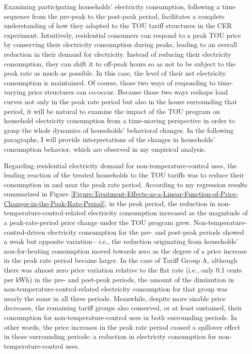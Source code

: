 Examining participating households' electricity consumption, following a time sequence from the pre-peak to the post-peak period, facilitates a complete understanding of how they adapted to the TOU tariff structures in the CER experiment. Intuitively, residential consumers can respond to a peak TOU price by conserving their electricity consumption during peaks, leading to an overall reduction in their demand for electricity. Instead of reducing their electricity consumption, they can shift it to off-peak hours so as not to be subject to the peak rate as much as possible. In this case, the level of their net electricity consumption is maintained. Of course, those two ways of responding to time-varying price structures can co-occur. Because those two ways reshape load curves not only in the peak rate period but also in the hours surrounding that period, it will be natural to examine the impact of the TOU program on household electricity consumption from a time-moving perspective in order to grasp the whole dynamics of households' behavioral changes. In the following paragraphs, I will provide interpretations of the changes in households' consumption behavior, which are observed in my empirical analysis. 

Regarding residential electricity demand for non-temperature-control uses, the leading reaction of the treated households to the TOU tariffs was to reduce their consumption in and near the peak rate period. According to my regression results summarized in Figure \ref{Figure:Treatment-Effects-as-a-Linear-Function-of-Price-Changes-in-the-Peak-Rate-Period}, in the peak period, the reduction in non-temperature-control-related electricity consumption increased as the magnitude of a peak-rate-period price change under the TOU program grew. Non-temperature-control-driven electricity consumption for the pre- and post-peak periods showed a weak but opposite variation---i.e., the reduction originating from households' non-for-heating consumption moved towards zero as the degree of a price increase in the peak rate period became larger. In the case of Tariff Group A, although there was almost zero price variation relative to the flat rate (i.e., only 0.1 cents per kWh) in the pre- and post-peak periods, the amount of the diminution in non-temperature-control-related electricity consumption for that group was nearly the same in all three periods. Meanwhile, despite more sizable price decreases, the remaining tariff groups also conserved, or at least sustained, their consumption for non-temperature-control uses in both surrounding periods. In other words, the price increases in the peak rate period caused a spillover effect in those surrounding periods: a reduction in electricity consumption for non-temperature-control uses.

